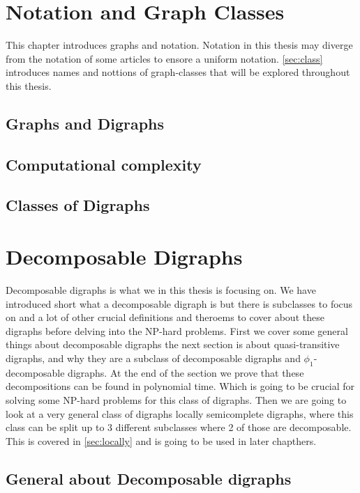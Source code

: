 
\chapter{Notation and Graph Classes}
This chapter introduces graphs and notation. 
Notation in this thesis may diverge from the notation of some articles to ensore a uniform notation.  \autoref{sec:class} introduces names and nottions of graph-classes that will be explored throughout this thesis.
\label{chap:intro}
\section{Graphs and Digraphs}
\label{sec:digraph}

\section{Computational complexity}
\label{sec:complexity}

\section{Classes of Digraphs}
\label{sec:class}


\chapter{Decomposable Digraphs}
\label{chap:decomposable}
Decomposable digraphs is what we in this thesis is focusing on. 
We have introduced short what a decomposable digraph is but there is subclasses to focus on and a lot of other crucial definitions and theroems to cover about these digraphs before delving into the NP-hard problems. 
First we cover some general things about decomposable digraphs the next section is about quasi-transitive digraphs, and why they are a subclass of decomposable digraphs and $\phi_1$-decomposable digraphs. At the end of the section we prove that these decompositions can be found in polynomial time. 
Which is going to be crucial for solving some NP-hard problems for this class of digraphs. Then we are going to look at a very general class of digraphs locally semicomplete digraphs, where this class can be split up to 3 different subclasses where 2 of those are decomposable. 
This is covered in \autoref{sec:locally} and is going to be used in later chapthers. 
\section{General about Decomposable digraphs}
\label{sec:gdecomposable}

